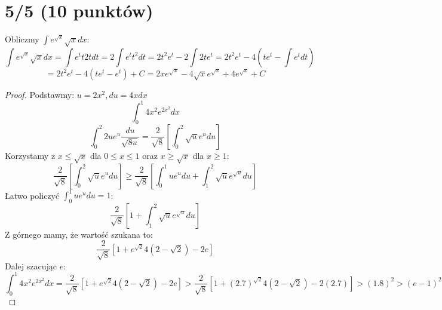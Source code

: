 \documentclass{article}
\title{}
\date{26.03.2020}
\author{Maurycy Borkowski}
\begin{document}
\maketitle

\section{5/5 (10 punktów)}
Obliczmy $\int e^{\sqrt x} \sqrt x dx$:\\
$$
\int e^{\sqrt x} \sqrt x dx = \int e^t t 2t dt = 2\int e^t t^2 dt = 2t^2 e^t - 2\int2t e^t = 2t^2e^t-4\left(te^t - \int e^tdt \right)
$$
$$
= 2t^2e^t-4\left(te^t -  e^t \right) + C = 2xe^{\sqrt x} - 4\sqrt{x}e^{\sqrt{x}} + 4e^{\sqrt{x}} + C
$$

\begin{proof}
Podstawmy: $u = 2x^2,du = 4xdx$\\
$$
\int_0^1 4x^2e^{2x^2}dx
$$
$$
\int_0^2 2ue^u \frac{du}{\sqrt{8u}} = \frac{2}{\sqrt{8}}\left [ \int_0^2 \sqrt{u}e^udu\right]
$$
Korzystamy z  $x \leq \sqrt{x}$ dla $0 \leq x \leq 1$ oraz $x \geq \sqrt{x}$ dla $ x \geq 1$:
$$
\frac{2}{\sqrt{8}}\left [ \int_0^2 \sqrt{u}e^udu\right] \geq \frac{2}{\sqrt{8}}\left [ \int_0^1 ue^udu + \int_1^2 \sqrt{u}e^{\sqrt u}du \right]
$$
Łatwo policzyć $\int_0^1 ue^udu = 1$:
$$
\frac{2}{\sqrt{8}}\left [1 + \int_1^2 \sqrt{u}e^{\sqrt u}du \right]
$$
Z górnego mamy, że wartość szukana to:
$$
\frac{2}{\sqrt{8}} [1 + e^{\sqrt{2}}4(2-\sqrt{2}) - 2e]
$$
Dalej szacując $e$:
$$
\int_0^1 4x^2e^{2x^2}dx = \frac{2}{\sqrt{8}} [1 + e^{\sqrt{2}}4(2-\sqrt{2}) - 2e] > \frac{2}{\sqrt{8}} [1 + (2.7)^{\sqrt{2}}4(2-\sqrt{2}) - 2(2.7)] > (1.8)^2 > (e-1)^2
$$
\end{proof}
\end{document}
